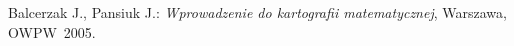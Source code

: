 \setcounter{secnumdepth}{-1}




%
%

\begin {thebibliography}{}
 Balcerzak J., Pansiuk J.: \emph{Wprowadzenie do kartografii matematycznej}, Warszawa, OWPW~2005.
\end {thebibliography}


\listoffigures

